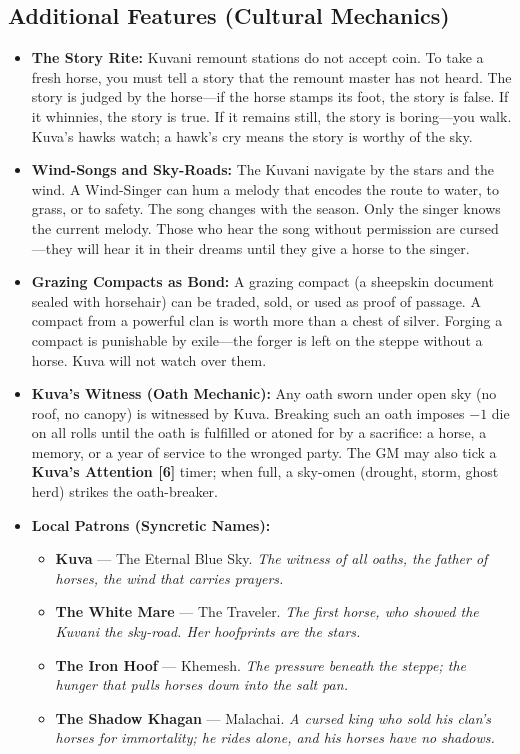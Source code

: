\subsection*{Additional Features (Cultural Mechanics)}
\label{sec:kuvani-mechanics}

\begin{itemize}
\item \textbf{The Story Rite:} Kuvani remount stations do not accept coin. To take a fresh horse, you must tell a story that the remount master has not heard. The story is judged by the horse---if the horse stamps its foot, the story is false. If it whinnies, the story is true. If it remains still, the story is boring---you walk. Kuva's hawks watch; a hawk's cry means the story is worthy of the sky.
\item \textbf{Wind-Songs and Sky-Roads:} The Kuvani navigate by the stars and the wind. A Wind-Singer can hum a melody that encodes the route to water, to grass, or to safety. The song changes with the season. Only the singer knows the current melody. Those who hear the song without permission are cursed---they will hear it in their dreams until they give a horse to the singer.
\item \textbf{Grazing Compacts as Bond:} A grazing compact (a sheepskin document sealed with horsehair) can be traded, sold, or used as proof of passage. A compact from a powerful clan is worth more than a chest of silver. Forging a compact is punishable by exile---the forger is left on the steppe without a horse. Kuva will not watch over them.
\item \textbf{Kuva's Witness (Oath Mechanic):} Any oath sworn under open sky (no roof, no canopy) is witnessed by Kuva. Breaking such an oath imposes \(-1\) die on all rolls until the oath is fulfilled or atoned for by a sacrifice: a horse, a memory, or a year of service to the wronged party. The GM may also tick a \textbf{Kuva's Attention [6]} timer; when full, a sky-omen (drought, storm, ghost herd) strikes the oath-breaker.
\item \textbf{Local Patrons (Syncretic Names):}
  \begin{itemize}
    \item \textbf{Kuva} --- The Eternal Blue Sky. \textit{The witness of all oaths, the father of horses, the wind that carries prayers.}
    \item \textbf{The White Mare} --- The Traveler. \textit{The first horse, who showed the Kuvani the sky-road. Her hoofprints are the stars.}
    \item \textbf{The Iron Hoof} --- Khemesh. \textit{The pressure beneath the steppe; the hunger that pulls horses down into the salt pan.}
    \item \textbf{The Shadow Khagan} --- Malachai. \textit{A cursed king who sold his clan's horses for immortality; he rides alone, and his horses have no shadows.}
  \end{itemize}
\end{itemize}

